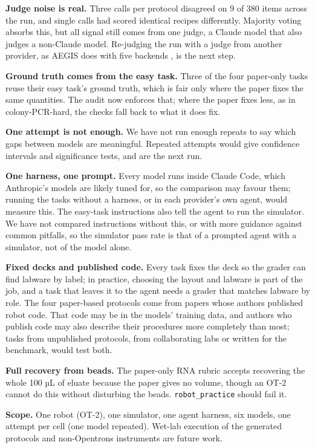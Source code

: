 \documentclass[
]{article}
\begin{document}
\textbf{Judge noise is real.} Three calls per protocol disagreed on 9 of
380 items across the run, and single calls had scored identical recipes
differently. Majority voting absorbs this, but all signal still comes
from one judge, a Claude model that also judges a non-Claude model.
Re-judging the run with a judge from another provider, as AEGIS does
with five backends \citep{setty2026aegis}, is the next step.

\textbf{Ground truth comes from the easy task.} Three of the four
paper-only tasks reuse their easy task's ground truth, which is fair
only where the paper fixes the same quantities. The audit now enforces
that; where the paper fixes less, as in colony-PCR-hard, the checks fall
back to what it does fix.

\textbf{One attempt is not enough.} We have not run enough repeats to
say which gaps between models are meaningful. Repeated attempts would
give confidence intervals and significance tests, and are the next run.

\textbf{One harness, one prompt.} Every model runs inside Claude Code,
which Anthropic's models are likely tuned for, so the comparison may
favour them; running the tasks without a harness, or in each provider's
own agent, would measure this. The easy-task instructions also tell the
agent to run the simulator. We have not compared instructions without
this, or with more guidance against common pitfalls, so the simulator
pass rate is that of a prompted agent with a simulator, not of the model
alone.

\textbf{Fixed decks and published code.} Every task fixes the deck so
the grader can find labware by label; in practice, choosing the layout
and labware is part of the job, and a task that leaves it to the agent
needs a grader that matches labware by role. The four paper-based
protocols come from papers whose authors published robot code. That code
may be in the models' training data, and authors who publish code may
also describe their procedures more completely than most; tasks from
unpublished protocols, from collaborating labs or written for the
benchmark, would test both.

\textbf{Full recovery from beads.} The paper-only RNA rubric accepts
recovering the whole 100 µL of eluate because the paper gives no volume,
though an OT-2 cannot do this without disturbing the beads.
\texttt{robot\_practice} should fail it.

\textbf{Scope.} One robot (OT-2), one simulator, one agent harness, six
models, one attempt per cell (one model repeated). Wet-lab execution of
the generated protocols and non-Opentrons instruments are future work.
\end{document}
